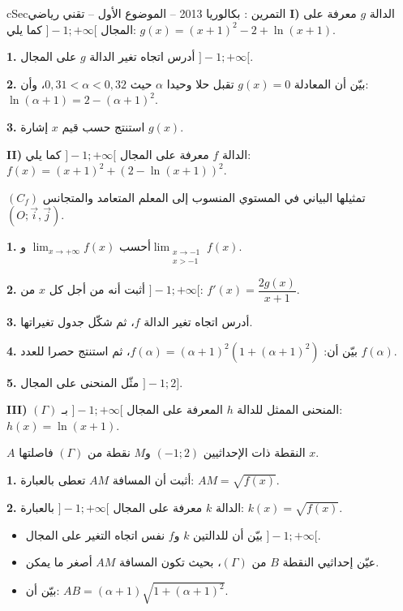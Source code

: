\documentclass[12pt,a4paper]{article}
\newenvironment{BOX}[2]{\begin{otherlanguage}{english}\begin{arbox}{#1}{#2}}{\end{arbox}\end{otherlanguage}}
\newcounter{exo}
\newenvironment{tamrin}[1]{\stepcounter{exo}\begin{BOX}{cSec}{التمرين \theexo: #1}}{\end{BOX}}
\newenvironment{sq}{\begin{itemize}[leftmargin=2.4em,itemsep=3pt]}{\end{itemize}}
\newcommand{\qa}{\item[(أ)]}\newcommand{\qb}{\item[(ب)]}\newcommand{\qc}{\item[(جـ)]}\newcommand{\qd}{\item[(د)]}\newcommand{\qe}{\item[(هـ)]}
\newcommand{\QQ}[1]{\par\smallskip\textbf{#1.} }
\begin{document}
\begin{tamrin}{بكالوريا 2013 -- الموضوع الأول -- تقني رياضي}
\textbf{I)} الدالة $g$ معرفة على المجال $]-1;+\infty[$ كما يلي: $g(x)=(x+1)^2-2+\ln(x+1)$.
\QQ{1} أدرس اتجاه تغير الدالة $g$ على المجال $]-1;+\infty[$.
\QQ{2} بيّن أن المعادلة $g(x)=0$ تقبل حلا وحيدا $\alpha$ حيث $0{,}31<\alpha<0{,}32$، وأن: $\ln(\alpha+1)=2-(\alpha+1)^2$.
\QQ{3} استنتج حسب قيم $x$ إشارة $g(x)$.

\textbf{II)} الدالة $f$ معرفة على المجال $]-1;+\infty[$ كما يلي: $f(x)=(x+1)^2+\left(2-\ln(x+1)\right)^2$.

$(C_f)$ تمثيلها البياني في المستوي المنسوب إلى المعلم المتعامد والمتجانس $(O;\vec{i},\vec{j})$.
\QQ{1} أحسب $\displaystyle\lim_{x\to+\infty}f(x)$ و$\displaystyle\lim_{\substack{x\to-1\\x>-1}}f(x)$.
\QQ{2} أثبت أنه من أجل كل $x$ من $]-1;+\infty[$: $f'(x)=\dfrac{2g(x)}{x+1}$.
\QQ{3} أدرس اتجاه تغير الدالة $f$، ثم شكّل جدول تغيراتها.
\QQ{4} بيّن أن: $f(\alpha)=(\alpha+1)^2\left(1+(\alpha+1)^2\right)$، ثم استنتج حصرا للعدد $f(\alpha)$.
\QQ{5} مثّل المنحنى على المجال $]-1;2]$.

\textbf{III)} $(\Gamma)$ المنحنى الممثل للدالة $h$ المعرفة على المجال $]-1;+\infty[$ بـ: $h(x)=\ln(x+1)$.

$A$ النقطة ذات الإحداثيين $(-1;2)$ و$M$ نقطة من $(\Gamma)$ فاصلتها $x$.
\QQ{1} أثبت أن المسافة $AM$ تعطى بالعبارة: $AM=\sqrt{f(x)}$.
\QQ{2} الدالة $k$ معرفة على المجال $]-1;+\infty[$ بالعبارة: $k(x)=\sqrt{f(x)}$.
\begin{sq}
\qa بيّن أن للدالتين $k$ و$f$ نفس اتجاه التغير على المجال $]-1;+\infty[$.
\qb عيّن إحداثيي النقطة $B$ من $(\Gamma)$، بحيث تكون المسافة $AM$ أصغر ما يمكن.
\qc بيّن أن: $AB=(\alpha+1)\sqrt{1+(\alpha+1)^2}$.
\end{sq}
\end{tamrin}
\end{document}

